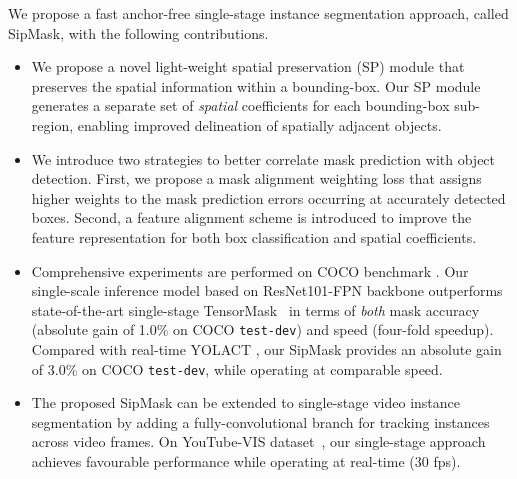 \documentclass[runningheads]{llncs}
\begin{document}
 We propose a fast anchor-free single-stage instance segmentation approach, called SipMask, with the following contributions. 
\begin{itemize}
    \item We propose a novel light-weight spatial preservation (SP) module that preserves the spatial information within a bounding-box. Our SP module generates a separate set of \textit{spatial} coefficients for each bounding-box sub-region, enabling improved delineation of spatially adjacent objects.
     \item We introduce two strategies to better correlate mask prediction with object detection. First, we propose a mask alignment weighting loss that assigns higher weights to the mask prediction errors occurring at accurately detected boxes. Second, a feature alignment scheme is introduced to improve the feature representation for both box classification and spatial coefficients.
     \item Comprehensive experiments are performed on COCO benchmark \cite{Lin_COCO_ECCV_2014}. Our single-scale inference model based on ResNet101-FPN backbone outperforms state-of-the-art single-stage TensorMask~\cite{Chen_TensorMask_ICCV_2019} in terms of \textit{both} mask accuracy (absolute gain of 1.0\% on COCO \texttt{test-dev}) and speed (four-fold speedup). Compared with real-time YOLACT \cite{Bolya_YOLACT_ICCV_2019}, our SipMask provides an absolute gain of 3.0\% on COCO \texttt{test-dev}, while operating at comparable speed.
     \item The proposed SipMask can be extended to single-stage video  instance  segmentation  by  adding a fully-convolutional branch for tracking instances across video frames. On YouTube-VIS dataset~\cite{Yang_VIS_ICCV_2019}, our single-stage approach achieves favourable performance while operating at real-time (30 fps). 
\end{itemize}
\end{document}
